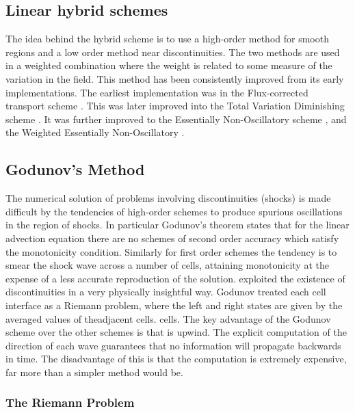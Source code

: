 \subsection{Linear hybrid schemes}
The idea behind the hybrid scheme is to use a high-order method for smooth regions and a low order method near discontinuities. The two methods are used in a weighted combination where the weight is related to some measure of the variation in the field.
This method has been consistently improved from its early implementations.
The earliest implementation was in the Flux-corrected transport scheme \citep{BB73}.
This was later improved into the Total Variation Diminishing scheme \citep{1983JCoPh..49..151H}.
It was further improved to the Essentially Non-Oscillatory scheme \citep{HEOC:1987}, and the Weighted Essentially Non-Oscillatory \citep{1994JCoPh.115..200L}.




\subsection{Godunov's Method}

The numerical solution of problems involving discontinuities (shocks) is made
difficult by the tendencies of high-order schemes to produce spurious
oscillations in the region of shocks. In particular Godunov's theorem
\citep{Go59} states that for the linear advection equation there are no schemes
of second order accuracy which satisfy the monotonicity condition. Similarly
for first order schemes the tendency is to smear the shock wave across a number
of cells, attaining monotonicity at the expense of a less accurate reproduction
of the solution. 
\citep{Go59} exploited the existence of discontinuities in a very physically insightful way.
Godunov treated each cell interface as a Riemann
problem, where the left and right states are given by the averaged values of theadjacent cells.
cells.
The key advantage of the Godunov scheme over the other schemes is that is
upwind. The explicit computation of the direction of each wave guarantees that
no information will propagate backwards in time. The disadvantage of this is
that the computation is extremely expensive, far more than a simpler method
\citep[e.g.][]{LW60} would be.

\subsubsection{The Riemann Problem}

